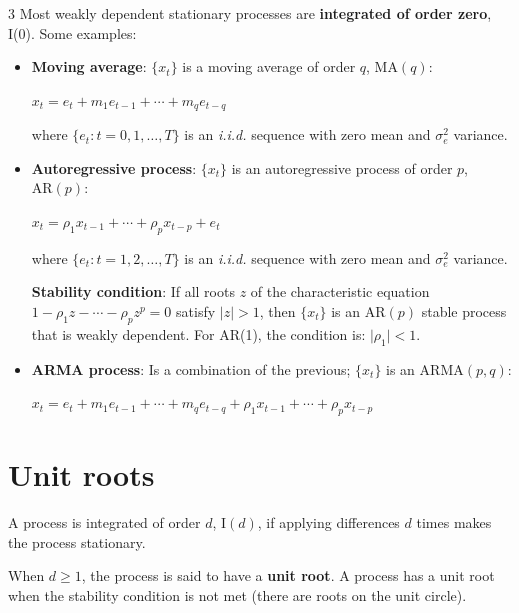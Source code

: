 \documentclass[10pt, a4paper, landscape]{article}
\begin{document}
\begin{multicols}{3}
Most weakly dependent stationary processes are \textbf{integrated of order zero}, I(0). Some examples:

\begin{itemize}[leftmargin=*]
	\item \textbf{Moving average}: \( \{ x_{t} \} \) is a moving average of order \( q \), \( \text{MA}(q) \):
	\begin{center}
		\( x_{t} = e_{t} + m_{1} e_{t - 1} + \cdots + m_{q} e_{t - q} \)
	\end{center}
	where \( \{ e_{t} : t = 0, 1, \ldots, T \} \) is an \textsl{i.i.d.} sequence with zero mean and \( \sigma_{e}^{2} \) variance.
	\item \textbf{Autoregressive process}: \( \{ x_{t} \} \) is an autoregressive process of order \( p \), \( \text{AR}(p) \):
	\begin{center}
		\( x_{t} = \rho_{1} x_{t - 1} + \cdots + \rho_{p} x_{t - p} + e_{t} \)
	\end{center}
	where \( \{ e_{t} : t = 1, 2, \ldots, T \} \) is an \textsl{i.i.d.} sequence with zero mean and \( \sigma_{e}^{2} \) variance.

	\textbf{Stability condition}: If all roots \( z \) of the characteristic equation \( 1 - \rho_{1} z - \cdots - \rho_{p} z^{p} = 0 \) satisfy \( \lvert z \rvert > 1 \), then \( \{ x_{t} \} \) is an \( \text{AR}(p) \) stable process that is weakly dependent. For AR(1), the condition is: \( \lvert \rho_{1} \rvert < 1 \).

	\item \textbf{ARMA process}: Is a combination of the previous; \( \{ x_{t} \} \) is an \( \text{ARMA}(p, q) \):
	\begin{center}
		\( x_{t} = e_{t} + m_{1} e_{t - 1} + \cdots + m_{q} e_{t - q} + \rho_{1} x_{t - 1} + \cdots + \rho_{p} x_{t - p} \)
	\end{center}
\end{itemize}

\columnbreak

\section*{Unit roots}

A process is integrated of order \( d \), \( \text{I}(d) \), if applying differences \( d \) times makes the process stationary.

When \( d \geq 1 \), the process is said to have a \textbf{unit root}. A process has a unit root when the stability condition is not met (there are roots on the unit circle).


\end{multicols}
\end{document}
